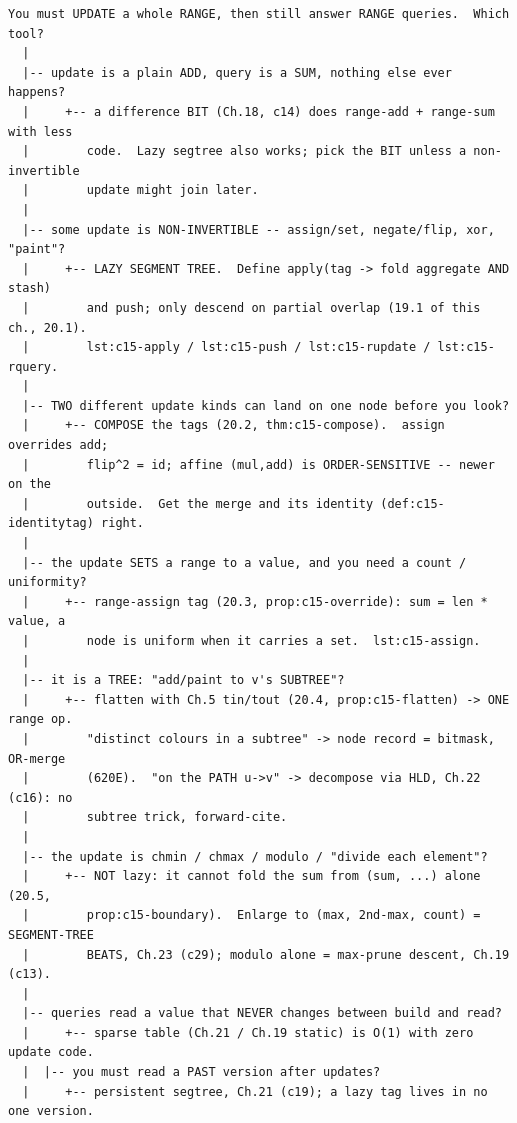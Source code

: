 \begin{lstlisting}[language={}, basicstyle=\ttfamily\small, numbers=none, frame=single]
  You must UPDATE a whole RANGE, then still answer RANGE queries.  Which tool?
  |
  |-- update is a plain ADD, query is a SUM, nothing else ever happens?
  |     +-- a difference BIT (Ch.18, c14) does range-add + range-sum with less
  |        code.  Lazy segtree also works; pick the BIT unless a non-invertible
  |        update might join later.
  |
  |-- some update is NON-INVERTIBLE -- assign/set, negate/flip, xor, "paint"?
  |     +-- LAZY SEGMENT TREE.  Define apply(tag -> fold aggregate AND stash)
  |        and push; only descend on partial overlap (19.1 of this ch., 20.1).
  |        lst:c15-apply / lst:c15-push / lst:c15-rupdate / lst:c15-rquery.
  |
  |-- TWO different update kinds can land on one node before you look?
  |     +-- COMPOSE the tags (20.2, thm:c15-compose).  assign overrides add;
  |        flip^2 = id; affine (mul,add) is ORDER-SENSITIVE -- newer on the
  |        outside.  Get the merge and its identity (def:c15-identitytag) right.
  |
  |-- the update SETS a range to a value, and you need a count / uniformity?
  |     +-- range-assign tag (20.3, prop:c15-override): sum = len * value, a
  |        node is uniform when it carries a set.  lst:c15-assign.
  |
  |-- it is a TREE: "add/paint to v's SUBTREE"?
  |     +-- flatten with Ch.5 tin/tout (20.4, prop:c15-flatten) -> ONE range op.
  |        "distinct colours in a subtree" -> node record = bitmask, OR-merge
  |        (620E).  "on the PATH u->v" -> decompose via HLD, Ch.22 (c16): no
  |        subtree trick, forward-cite.
  |
  |-- the update is chmin / chmax / modulo / "divide each element"?
  |     +-- NOT lazy: it cannot fold the sum from (sum, ...) alone (20.5,
  |        prop:c15-boundary).  Enlarge to (max, 2nd-max, count) = SEGMENT-TREE
  |        BEATS, Ch.23 (c29); modulo alone = max-prune descent, Ch.19 (c13).
  |
  |-- queries read a value that NEVER changes between build and read?
  |     +-- sparse table (Ch.21 / Ch.19 static) is O(1) with zero update code.
  |  |-- you must read a PAST version after updates?
  |     +-- persistent segtree, Ch.21 (c19); a lazy tag lives in no one version.
\end{lstlisting}


